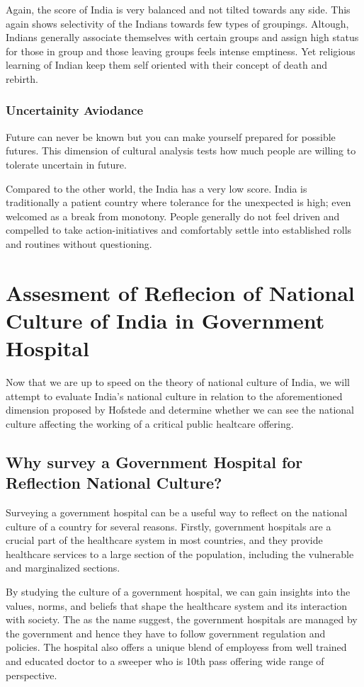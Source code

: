 \documentclass{article}
\begin{document}
Again, the score of India is very balanced and not tilted towards any side. This again shows selectivity of the Indians towards few types of groupings. Altough, Indians generally associate themselves with certain groups and assign high status for those in group and those leaving groups feels intense emptiness. Yet religious learning of Indian keep them self oriented with their concept of death and rebirth.

\subsubsection{Uncertainity Aviodance}

Future can never be known but you can make yourself prepared for possible futures. This dimension of cultural analysis tests how much people are willing to tolerate uncertain in future.

Compared to the other world, the India has a very low score. India is traditionally a patient country where tolerance for the unexpected is high; even welcomed as a break from monotony. People generally do not feel driven and compelled to take action-initiatives and comfortably settle into established rolls and routines without questioning.

\section{Assesment of Reflecion of National Culture of India in Government Hospital}

Now that we are up to speed on the theory of national culture of India, we will attempt to evaluate India's national culture in relation to the aforementioned dimension proposed by Hofstede and determine whether we can see the national culture affecting the working of a critical public healtcare offering.

\subsection{Why survey a Government Hospital for Reflection National Culture?}

Surveying a government hospital can be a useful way to reflect on the national culture of a country for several reasons. Firstly, government hospitals are a crucial part of the healthcare system in most countries, and they provide healthcare services to a large section of the population, including the vulnerable and marginalized sections.

By studying the culture of a government hospital, we can gain insights into the values, norms, and beliefs that shape the healthcare system and its interaction with society. The as the name suggest, the government hospitals are managed by the government and hence they have to follow government regulation and policies\cite{ref: IPCH}. The hospital also offers a unique blend of employess from well trained and educated doctor to a sweeper who is 10th pass offering wide range of perspective.
\end{document}
